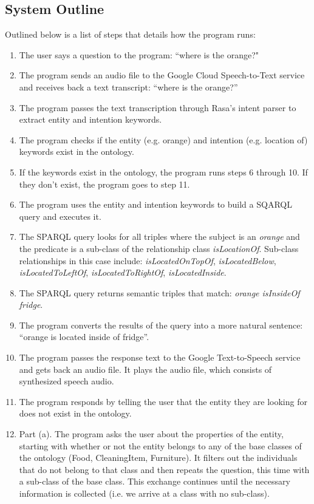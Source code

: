 \documentclass{article}
\begin{document}
\subsection{System Outline}
Outlined below is a list of steps that details how the program runs:
\begin{enumerate}
    \item The user says a question to the program: ``where is the orange?"
    \item The program sends an audio file to the Google Cloud Speech-to-Text 
        service and receives back a text transcript: ``where is the orange?''
    \item The program passes the text transcription through Rasa's intent     
        parser to extract entity and intention keywords.
    \item The program checks if the entity (e.g. orange) and intention
        (e.g. location of) keywords exist in the ontology.
    \item If the keywords exist in the ontology, the program runs
        steps 6 through 10. If they don't exist, the program goes to step 11.
    \item The program uses the entity and intention keywords to build a 
        SQARQL query and executes it.
    \item The SPARQL query looks for all triples where the subject is             an \textit{orange} and the predicate is a sub-class of the 
        relationship class \textit{isLocationOf}. Sub-class relationships
        in this case include: \textit{isLocatedOnTopOf}, 
        \textit{isLocatedBelow}, \textit{isLocatedToLeftOf}, \textit{isLocatedToRightOf}, \textit{isLocatedInside}.
    \item The SPARQL query returns semantic triples that match:
        \textit{orange isInsideOf fridge}.
    \item The program converts the results of the query into a more 
        natural sentence: ``orange is located inside of fridge''.
    \item The program passes the response text to the 
        Google Text-to-Speech service and gets back an audio file. It plays
        the audio file, which consists of synthesized speech audio.
    \item The program responds by telling the user that the entity they are 
        looking for does not exist in the ontology.
    \item Part (a). The program asks the user about the properties of the     
        entity, starting with whether or not the entity belongs to any of the 
        base classes of the ontology (Food, CleaningItem, Furniture). It 
        filters out the individuals that do not belong to that class and then 
        repeats the question, this time with a sub-class of the base class. 
        This exchange continues until the necessary information is collected 
        (i.e. we arrive at a class with no sub-class). 
        

\end{enumerate}
\end{document}
